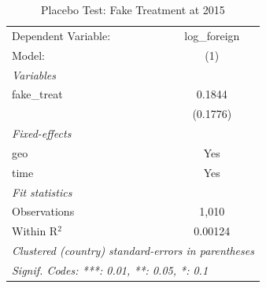 
\begin{table}[htbp]
   \caption{\label{tab:placebo_timing} Placebo Test: Fake Treatment at 2015}
   \centering
   \begin{tabular}{lc}
      \tabularnewline \midrule \midrule
      Dependent Variable: & log\_foreign\\   
      Model:              & (1)\\  
      \midrule
      \emph{Variables}\\
      fake\_treat         & 0.1844\\   
                          & (0.1776)\\   
      \midrule
      \emph{Fixed-effects}\\
      geo                 & Yes\\  
      time                & Yes\\  
      \midrule
      \emph{Fit statistics}\\
      Observations        & 1,010\\  
      Within R$^2$        & 0.00124\\  
      \midrule \midrule
      \multicolumn{2}{l}{\emph{Clustered (country) standard-errors in parentheses}}\\
      \multicolumn{2}{l}{\emph{Signif. Codes: ***: 0.01, **: 0.05, *: 0.1}}\\
   \end{tabular}
\end{table}



